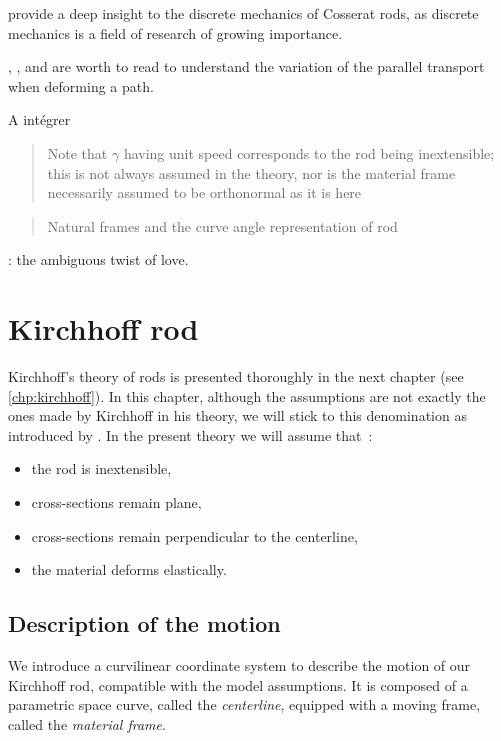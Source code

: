 provide a deep insight to the discrete mechanics of Cosserat rods, as discrete mechanics is a field of research of growing importance.

, ,  and  are worth to read to understand the variation of the parallel transport when deforming a path.

A intégrer

\blockcquote[p.~607]{Langer1996}{Note that $\gamma$ having unit speed corresponds to the rod being inextensible; this is not always assumed in the theory, nor is the material frame necessarily assumed to be orthonormal as it is here}
\blockcquote[p.~607]{Langer1996}{Natural frames and the curve angle representation of rod}

 : the ambiguous twist of love.



\section{Kirchhoff rod}\label{sec:kirchhoff_rod}
Kirchhoff's theory of rods is presented thoroughly in the next chapter (see \cref{chp:kirchhoff}). In this chapter, although the assumptions are not exactly the ones made by  Kirchhoff in his theory, we will stick to this denomination as introduced by \cite{Bergou2008}. In the present theory we will assume that~:
\begin{itemize}
\item the rod is inextensible,
\item cross-sections remain plane,
\item cross-sections remain perpendicular to the centerline,
\item the material deforms elastically.
\end{itemize}

\subsection{Description of the motion}\label{sec:description_motion}
We introduce a curvilinear coordinate system to describe the motion of our Kirchhoff rod, compatible with the model assumptions. It is composed of a parametric space curve, called the \emph{centerline}, equipped with a moving frame, called the \emph{material frame}.

